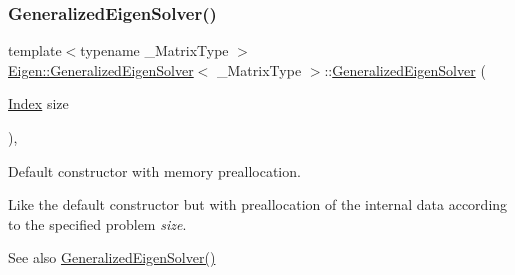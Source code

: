 \subsubsection{\texorpdfstring{GeneralizedEigenSolver()}{GeneralizedEigenSolver()}\hspace{0.1cm}{\footnotesize\ttfamily [2/3]}}
{\footnotesize\ttfamily template$<$typename \+\_\+\+Matrix\+Type $>$ \\
\mbox{\hyperlink{class_eigen_1_1_generalized_eigen_solver}{Eigen\+::\+Generalized\+Eigen\+Solver}}$<$ \+\_\+\+Matrix\+Type $>$\+::\mbox{\hyperlink{class_eigen_1_1_generalized_eigen_solver}{Generalized\+Eigen\+Solver}} (\begin{DoxyParamCaption}\item[{\mbox{\hyperlink{class_eigen_1_1_generalized_eigen_solver_a46a0ff3841059479ec314e56a5645302}{Index}}}]{size }\end{DoxyParamCaption})\hspace{0.3cm}{\ttfamily [inline]}, {\ttfamily [explicit]}}



Default constructor with memory preallocation. 

Like the default constructor but with preallocation of the internal data according to the specified problem {\itshape size}. \begin{DoxySeeAlso}{See also}
\mbox{\hyperlink{class_eigen_1_1_generalized_eigen_solver_ae745f39da43f9df192cc2875d82b4cf1}{Generalized\+Eigen\+Solver()}} 
\end{DoxySeeAlso}
\mbox{\label{class_eigen_1_1_generalized_eigen_solver_a2a3528cbf75f66d3a60af9dc7b12ff65}} 
